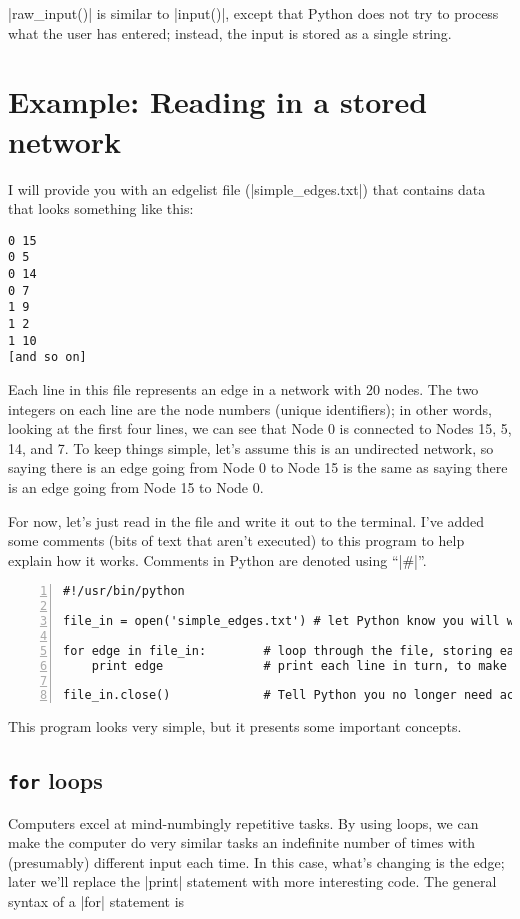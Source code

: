 \documentclass{article}
\begin{document}
|raw_input()| is similar to |input()|, except that Python does not try to process what
the user has entered; instead, the input is stored as a single string.

\section{Example: Reading in a stored network}
\label{stored_net}
I will provide you with an edgelist file (|simple_edges.txt|) that contains data that looks something
like this:

\begin{Verbatim}
0 15                          
0 5                           
0 14                          
0 7                           
1 9                           
1 2                           
1 10                          
[and so on]
\end{Verbatim}

Each line in this file represents an edge in a network with 20 nodes.  The two integers on
each line are the node numbers (unique identifiers); in other words, looking at the first four lines, we can see that Node 0 is
connected to Nodes 15, 5, 14, and 7.  To keep things simple, let's assume this is an
undirected network, so saying there is an edge going from Node 0 to Node 15 is
the same as saying there is an edge going from Node 15 to Node 0.

For now, let's just read in the file and write it out to the terminal.  I've added some comments (bits of text that
aren't executed) to this program to help explain how it works. Comments in Python are denoted using ``|#|''.

\begin{Verbatim}[numbers=left, samepage=true]
#!/usr/bin/python

file_in = open('simple_edges.txt') # let Python know you will want to access the file

for edge in file_in:        # loop through the file, storing each line in turn in 'edge'
    print edge              # print each line in turn, to make sure everything's working

file_in.close()             # Tell Python you no longer need access
\end{Verbatim}
This program looks very simple, but it presents some important concepts.

\subsection{\texttt{for} loops}
Computers excel at mind-numbingly repetitive tasks.  By using loops, we can make the computer do very similar tasks an indefinite number of times 
with (presumably) different input each time.  In this case, what's changing is the edge; later we'll replace the |print| statement 
with more interesting code.  The general syntax of a |for| statement is\\
\end{document}
